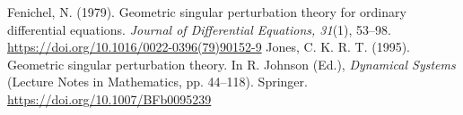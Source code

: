  Fenichel, N. (1979). Geometric singular perturbation theory for ordinary differential equations. \emph{Journal of Differential Equations, 31}(1), 53--98. \url{https://doi.org/10.1016/0022-0396(79)90152-9}
 Jones, C. K. R. T. (1995). Geometric singular perturbation theory. In R. Johnson (Ed.), \emph{Dynamical Systems} (Lecture Notes in Mathematics, pp. 44--118). Springer. \url{https://doi.org/10.1007/BFb0095239}

